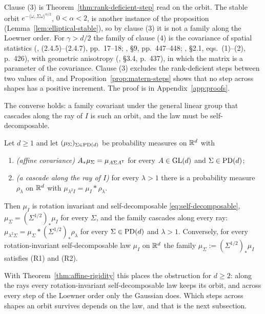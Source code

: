 Clause (3) is Theorem~\ref{thm:rank-deficient-step} read on the orbit. The stable orbit
$e^{-\langle\omega,\Sigma\omega\rangle^{\alpha/2}}$, $0 < \alpha < 2$, is another instance of the
proposition (Lemma~\ref{lem:elliptical-stable}), so by clause (3) it is not a family along the Loewner
order. For $\gamma > d/2$ the family of clause (4) is the \Matern{} covariance of spatial statistics
(, (2.4.5)--(2.4.7), pp.~17--18; , \S9,
pp.~447--448; , \S2.1, eqs.~(1)--(2), p.~426), with geometric anisotropy
(, \S3.4, p.~437), in which the matrix is a parameter of the covariance. Clause (3) excludes
the rank-deficient steps between two values of it, and Proposition~\ref{prop:matern-steps} shows that
no step across shapes has a positive increment.
The proof is in Appendix~\ref{app:proofs}.


The converse holds: a family covariant under the general linear group that cascades along the ray of
$I$ is such an orbit, and the law must be self-decomposable.

\begin{proposition}\label{prop:ray-families}
Let $d \ge 1$ and let $(\mu_\Sigma)_{\Sigma\in\mathrm{PD}(d)}$ be probability measures on $\mathbb{R}^d$ with
\begin{enumerate}
\item[(R1)] \emph{(affine covariance)} $A_*\mu_\Sigma = \mu_{A\Sigma A^{\mathsf{T}}}$ for every
$A \in \mathrm{GL}(d)$ and $\Sigma \in \mathrm{PD}(d)$;
\item[(R2)] \emph{(a cascade along the ray of $I$)} for every $\lambda > 1$ there is a probability
measure $\rho_\lambda$ on $\mathbb{R}^d$ with $\mu_{\lambda^2I} = \mu_I * \rho_\lambda$.
\end{enumerate}
Then $\mu_I$ is rotation invariant and self-decomposable \ref{eq:self-decomposable},
$\mu_\Sigma = (\Sigma^{1/2})_*\mu_I$ for every $\Sigma$, and the family cascades along every ray:
$\mu_{\lambda^2\Sigma} = \mu_\Sigma * (\Sigma^{1/2})_*\rho_\lambda$ for every $\Sigma \in \mathrm{PD}(d)$
and $\lambda > 1$. Conversely, for every rotation-invariant self-decomposable law $\mu_I$ on
$\mathbb{R}^d$ the family $\mu_\Sigma := (\Sigma^{1/2})_*\mu_I$ satisfies (R1) and (R2).
\end{proposition}

With Theorem~\ref{thm:affine-rigidity} this places the obstruction for $d \ge 2$: along the rays every
rotation-invariant self-decomposable law keeps its orbit, and across every step of the Loewner order
only the Gaussian does. Which steps across shapes
an orbit survives depends on the law, and that is the next subsection.

